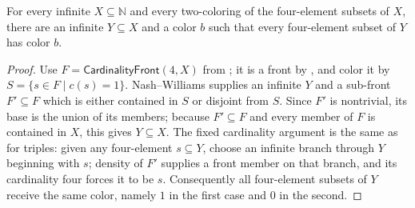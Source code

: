 \begin{lemma}
For every infinite $X\subseteq\mathbb N$ and every two-coloring of the
four-element subsets of $X$, there are an infinite $Y\subseteq X$ and a
color $b$ such that every four-element subset of $Y$ has color $b$.
\end{lemma}
\begin{proof}
Use $F=\mathsf{CardinalityFront}(4,X)$ from
; it is a front by
, and color it by
$S=\{s\in F\mid c(s)=1\}$.  Nash--Williams
 supplies an infinite $Y$ and a
sub-front $F'\subseteq F$ which is either contained in $S$ or disjoint
from $S$.  Since $F'$ is nontrivial, its base is the union of its
members; because $F'\subseteq F$ and every member of $F$ is contained in
$X$, this gives $Y\subseteq X$.  The fixed cardinality argument is the same as for triples:
given any four-element $s\subseteq Y$, choose an infinite branch through
$Y$ beginning with $s$; density of $F'$ supplies a front member on that
branch, and its cardinality four forces it to be $s$.  Consequently all
four-element subsets of $Y$ receive the same color, namely $1$ in the
first case and $0$ in the second.
\end{proof}
